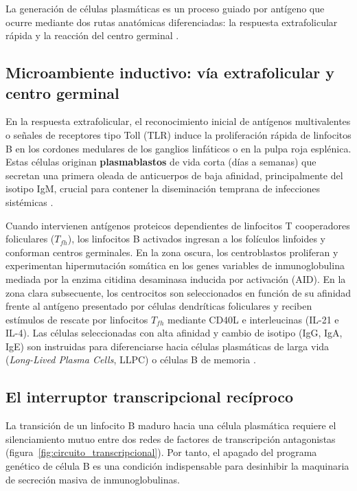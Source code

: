 La generación de células plasmáticas es un proceso guiado por antígeno que ocurre mediante dos rutas anatómicas diferenciadas: la respuesta extrafolicular rápida y la reacción del centro germinal \parencite{nutt2015generation}.

\subsection{Microambiente inductivo: vía extrafolicular y centro germinal}
En la respuesta extrafolicular, el reconocimiento inicial de antígenos multivalentes o señales de receptores tipo Toll (TLR) induce la proliferación rápida de linfocitos B en los cordones medulares de los ganglios linfáticos o en la pulpa roja esplénica. Estas células originan \textbf{plasmablastos} de vida corta (días a semanas) que secretan una primera oleada de anticuerpos de baja afinidad, principalmente del isotipo IgM, crucial para contener la diseminación temprana de infecciones sistémicas \parencite{abbas2022cellular}.

Cuando intervienen antígenos proteicos dependientes de linfocitos T cooperadores foliculares ($T_{fh}$), los linfocitos B activados ingresan a los folículos linfoides y conforman centros germinales. En la zona oscura, los centroblastos proliferan y experimentan hipermutación somática en los genes variables de inmunoglobulina mediada por la enzima citidina desaminasa inducida por activación (AID). En la zona clara subsecuente, los centrocitos son seleccionados en función de su afinidad frente al antígeno presentado por células dendríticas foliculares y reciben estímulos de rescate por linfocitos $T_{fh}$ mediante CD40L e interleucinas (IL-21 e IL-4). Las células seleccionadas con alta afinidad y cambio de isotipo (IgG, IgA, IgE) son instruidas para diferenciarse hacia células plasmáticas de larga vida (\emph{Long-Lived Plasma Cells}, LLPC) o células B de memoria \parencite{tellier2019plasma,abbas2022cellular}.

\subsection{El interruptor transcripcional recíproco}
La transición de un linfocito B maduro hacia una célula plasmática requiere el silenciamiento mutuo entre dos redes de factores de transcripción antagonistas \parencite{shapiroshelef2005regulation} (figura~\ref{fig:circuito_transcripcional}). Por tanto, el apagado del programa genético de célula B es una condición indispensable para desinhibir la maquinaria de secreción masiva de inmunoglobulinas.

